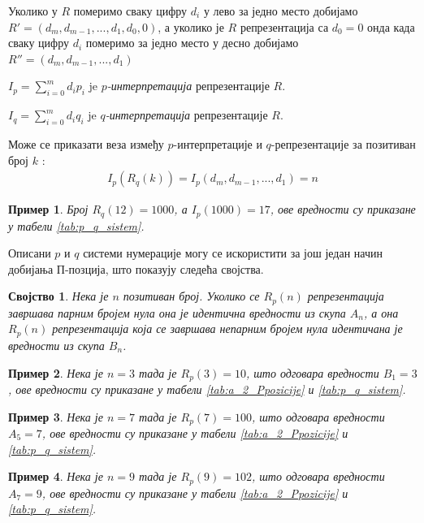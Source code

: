 \documentclass[a4paper]{article}
\newtheorem{example}{Пример}
\newtheorem{property}{Својство}
\begin{document}
Уколико у $ R $ померимо сваку цифру $ d_{i} $ у лево за једно место добијамо $ R' = (d_{m}, d_{m-1}, ... , d_{1}, d_{0}, 0) $, а уколико је $ R $ репрезентација са $ d_{0} = 0 $ онда када сваку цифру $ d_{i} $ померимо за једно место у десно добијамо $ R'' = (d_{m}, d_{m-1}, ... , d_{1}) $ 

$ I_{p} = \sum_{i=0}^{m} d_{i}p_{i} $ je \textit{$ p $-интерпретација} репрезентације $ R $.

$ I_{q} = \sum_{i=0}^{m} d_{i}q_{i} $ je \textit{$ q $-интерпретација} репрезентације $ R $.

Може се приказати веза између $ p $-интерпретације и $ q $-репрезентације за позитиван број $ k $ :
\begin{eqnarray}
	I_{p}(R_{q}(k)) = I_{p}(d_{m}, d_{m-1}, ..., d_{1}) = n
\end{eqnarray} 

\begin{example}
	Број $ R_{q}(12) = 1000 $, а $ I_{p}(1000) = 17 $, ове вредности су приказане у табели \ref{tab:p_q_sistem}.
\end{example}

Описани $ p $ и $ q $ системи нумерације могу се искористити за још један начин добијања П-позција, што показују следећа својства.

\begin{property}
	\label{prop:r_p_nule}
	Нека је $ n $ позитиван број. Уколико се $ R_p(n) $ репрезентација завршава парним бројем нула она је идентична вредности из скупа $ A_{n} $, а она $ R_p(n) $ репрезентација која се завршава непарним бројем нула идентичана је вредности из скупа $ B_{n} $.
\end{property}

\begin{example}
	Нека је $ n = 3 $ тада је $ R_{p}(3) = 10 $, што одговара вредности $ B_{1} = 3 $, ове вредности су приказане у табели \ref{tab:a_2_Ppozicije} и \ref{tab:p_q_sistem}.
\end{example}

\begin{example}
	Нека је $ n = 7 $ тада је $ R_{p}(7) = 100 $, што одговара вредности $ A_{5} = 7 $, ове вредности су приказане у табели \ref{tab:a_2_Ppozicije} и \ref{tab:p_q_sistem}.
\end{example}

\begin{example}
	Нека је $ n = 9 $ тада је $ R_{p}(9) = 102 $, што одговара вредности $ A_{7} = 9 $, ове вредности су приказане у табели \ref{tab:a_2_Ppozicije} и \ref{tab:p_q_sistem}.
\end{example}
\end{document}
